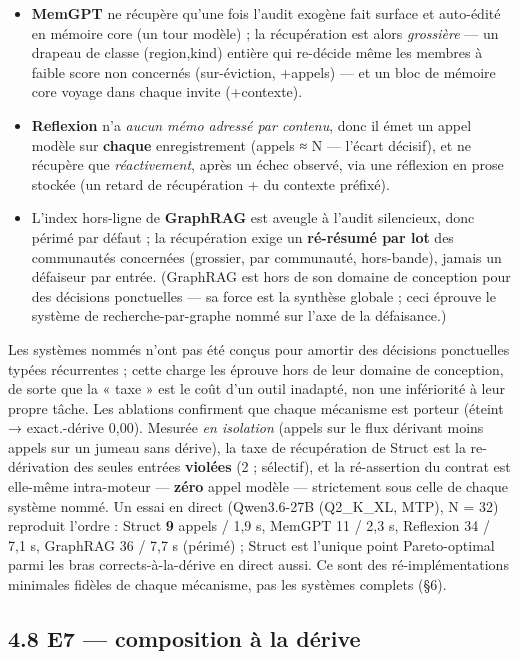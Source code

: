 \documentclass[11pt]{article}
\begin{document}
\begin{itemize}
\item \textbf{MemGPT} ne récupère qu'une fois l'audit exogène fait surface et auto-édité en mémoire core (un tour modèle) ; la récupération est alors \emph{grossière} — un drapeau de classe (region,kind) entière qui re-décide même les membres à faible score non concernés (sur-éviction, +appels) — et un bloc de mémoire core voyage dans chaque invite (+contexte).
\item \textbf{Reflexion} n'a \emph{aucun mémo adressé par contenu}, donc il émet un appel modèle sur \textbf{chaque} enregistrement (appels ≈ N — l'écart décisif), et ne récupère que \emph{réactivement}, après un échec observé, via une réflexion en prose stockée (un retard de récupération + du contexte préfixé).
\item L'index hors-ligne de \textbf{GraphRAG} est aveugle à l'audit silencieux, donc périmé par défaut ; la récupération exige un \textbf{ré-résumé par lot} des communautés concernées (grossier, par communauté, hors-bande), jamais un défaiseur par entrée. (GraphRAG est hors de son domaine de conception pour des décisions ponctuelles — sa force est la synthèse globale ; ceci éprouve le système de recherche-par-graphe nommé sur l'axe de la défaisance.)
\end{itemize}

Les systèmes nommés n'ont pas été conçus pour amortir des décisions ponctuelles typées récurrentes ; cette charge les éprouve hors de leur domaine de conception, de sorte que la « taxe » est le coût d'un outil inadapté, non une infériorité à leur propre tâche. Les ablations confirment que chaque mécanisme est porteur (éteint → exact.-dérive 0,00). Mesurée \emph{en isolation} (appels sur le flux dérivant moins appels sur un jumeau sans dérive), la taxe de récupération de Struct est la re-dérivation des seules entrées \textbf{violées} (2 ; sélectif), et la ré-assertion du contrat est elle-même intra-moteur — \textbf{zéro} appel modèle — strictement sous celle de chaque système nommé. Un essai en direct (Qwen3.6-27B (Q2\_K\_XL, MTP), N = 32) reproduit l'ordre : Struct \textbf{9} appels / 1,9 s, MemGPT 11 / 2,3 s, Reflexion 34 / 7,1 s, GraphRAG 36 / 7,7 s (périmé) ; Struct est l'unique point Pareto-optimal parmi les bras corrects-à-la-dérive en direct aussi. Ce sont des ré-implémentations minimales fidèles de chaque mécanisme, pas les systèmes complets (§6).

\subsection*{4.8 E7 — composition à la dérive}
\end{document}
